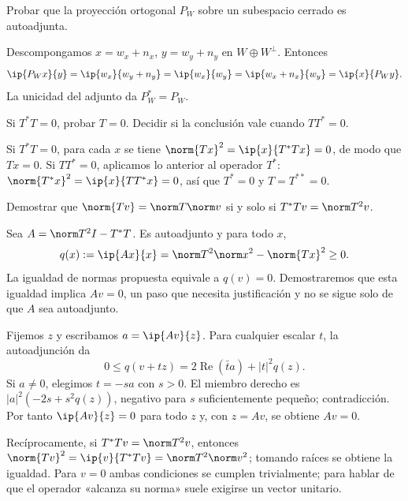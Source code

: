 \begin{ejercicio}\label{ej:lectura-32-5}
Probar que la proyección ortogonal $P_W$ sobre un subespacio cerrado es autoadjunta.
\end{ejercicio}
\begin{solucion}
Descompongamos $x=w_x+n_x$, $y=w_y+n_y$ en $W\oplus W^{\perp}$. Entonces
\[
 \ip{P_Wx}{y}=\ip{w_x}{w_y+n_y}=\ip{w_x}{w_y}
 =\ip{w_x+n_x}{w_y}=\ip{x}{P_Wy}.
\]
La unicidad del adjunto da $P_W^*=P_W$.
\end{solucion}

\begin{ejercicio}\label{ej:lectura-32-6}
Si $T^*T=0$, probar $T=0$. Decidir si la conclusión vale cuando $TT^*=0$.
\end{ejercicio}
\begin{solucion}
Si $T^*T=0$, para cada $x$ se tiene $\norm{Tx}^{2}=\ip{x}{T^*Tx}=0$, de modo que $Tx=0$. Si $TT^*=0$, aplicamos lo anterior al operador $T^*$: $\norm{T^*x}^{2}=\ip{x}{TT^*x}=0$, así que $T^*=0$ y $T=T^{**}=0$.
\end{solucion}

\begin{ejercicio}\label{ej:lectura-32-7}
Demostrar que $\norm{Tv}=\norm T\norm v$ si y solo si $T^*Tv=\norm T^{2}v$.
\end{ejercicio}
\begin{solucion}
Sea $A=\norm T^{2}I-T^*T$. Es autoadjunto y para todo $x$,
\[
 q(x):=\ip{Ax}{x}=\norm T^{2}\norm x^{2}-\norm{Tx}^{2}\geq0.
\]
La igualdad de normas propuesta equivale a $q(v)=0$. Demostraremos que esta igualdad implica $Av=0$, un paso que necesita justificación y no se sigue solo de que $A$ sea autoadjunto.

Fijemos $z$ y escribamos $a=\ip{Av}{z}$. Para cualquier escalar $t$, la autoadjunción da
\[
0\leq q(v+tz)=2\operatorname{Re}(\bar t a)+|t|^{2}q(z).
\]
Si $a\ne0$, elegimos $t=-sa$ con $s>0$. El miembro derecho es $|a|^{2}(-2s+s^{2}q(z))$, negativo para $s$ suficientemente pequeño; contradicción. Por tanto $\ip{Av}{z}=0$ para todo $z$ y, con $z=Av$, se obtiene $Av=0$.

Recíprocamente, si $T^*Tv=\norm T^{2}v$, entonces $\norm{Tv}^{2}=\ip{v}{T^*Tv}=\norm T^{2}\norm v^{2}$; tomando raíces se obtiene la igualdad. Para $v=0$ ambas condiciones se cumplen trivialmente; para hablar de que el operador «alcanza su norma» suele exigirse un vector unitario.
\end{solucion}

